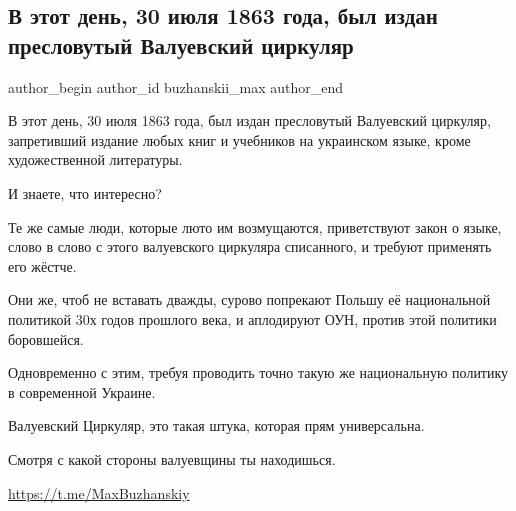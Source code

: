  
 
 
 
 
 
\subsection{В этот день, 30 июля 1863 года, был издан пресловутый Валуевский циркуляр}
\label{sec:30_07_2021.fb.buzhanskii_max.1.valuev_cirkuljar}
 
\ifcmt
 author_begin
   author_id buzhanskii_max
 author_end
\fi


В этот день, 30 июля 1863 года, был издан пресловутый Валуевский циркуляр,
запретивший издание любых книг и учебников на украинском языке, кроме
художественной литературы.

И знаете, что интересно?

Те же самые люди, которые люто им возмущаются, приветствуют закон о языке,
слово в слово с этого валуевского циркуляра списанного, и требуют применять его
жёстче.

Они же, чтоб не вставать дважды, сурово попрекают Польшу её национальной
политикой 30х годов прошлого века, и аплодируют ОУН, против этой политики
боровшейся.

Одновременно с этим, требуя проводить точно такую же национальную политику в
современной Украине.

Валуевский Циркуляр, это такая штука, которая прям универсальна.

Смотря с какой стороны валуевщины ты находишься.

\url{https://t.me/MaxBuzhanskiy}

